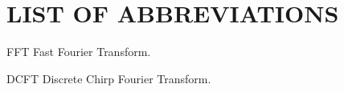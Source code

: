 \chapter*{LIST OF ABBREVIATIONS}
%

\begin{symbollist*}

\item[FFT]  Fast Fourier Transform.
\item[DCFT] Discrete Chirp Fourier Transform.


\end{symbollist*}
